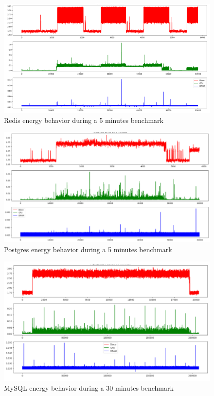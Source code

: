     \begin{figure}[h]
        \centering
        \includegraphics[width=1\columnwidth]{results/grafostempo/Redis5m.png}
        \caption{Redis energy behavior during a 5 minutes benchmark}
        \label{fig:redistime5m}
    \end{figure}
    
    
        
    \begin{figure}[h]
        \centering
        \includegraphics[width=1\columnwidth]{results/grafostempo/postgres5m.png}
        \caption{Postgres energy behavior during a 5 minutes benchmark}
        \label{fig:PostGrestime5m}
    \end{figure}
    

    \begin{figure}[h]
\centering
        \centering
        \includegraphics[width=1\columnwidth]{results/grafostempo/mysql10m.png}
        \caption{MySQL energy behavior during a 30 minutes benchmark}
        \label{fig:mysqltime}
    \end{figure}
    
